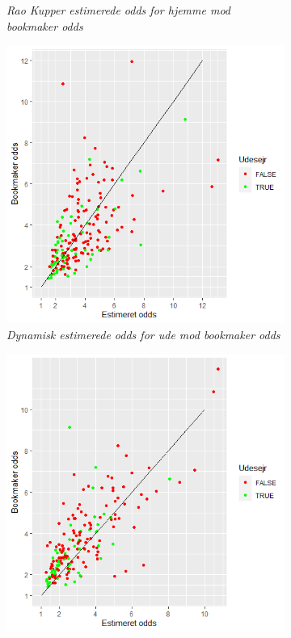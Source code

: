 \documentclass[11pt,a4paper]{article}
\begin{document}
\begin{figure}[ht!]
\begin{subfigure}[b]{0.4\linewidth}
    \caption{\textit{Rao Kupper estimerede odds for hjemme mod bookmaker odds}}
    \label{fig:StatHjemmeOdds}  
    \end{subfigure}
  \hspace{0.2cm}
  \begin{subfigure}[b]{0.4\linewidth}
    \includegraphics[width=\textwidth]{DynUdeOdds.png}
    \caption{\textit{Dynamisk estimerede odds for ude mod bookmaker odds}}
    \label{fig:DynUdeOdds}
  \end{subfigure}
        \hspace{0.2cm}
  \begin{subfigure}[b]{0.4\linewidth}
\includegraphics[width=\textwidth]{StatUdeOdds.png}

\end{subfigure}
\end{figure}
\end{document}

